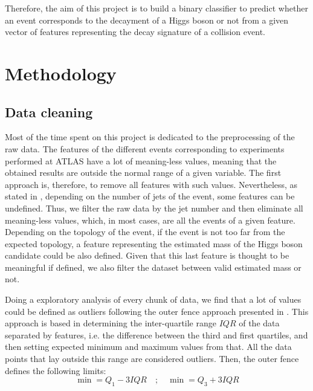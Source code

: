 \documentclass[10pt,conference,compsocconf]{IEEEtran}
\begin{document}

Therefore, the aim of this project is to build a binary classifier to predict whether an event corresponds to the decayment of a Higgs boson or not from a given vector of features representing the decay signature of a collision event.


\section{Methodology}
\label{sec:methodology}
\subsection{Data cleaning}
\label{sec:data-cleaning}
Most of the time spent on this project is dedicated to the preprocessing of the raw data. The features of the different events corresponding to experiments performed at ATLAS have a lot of meaning-less values, meaning that the obtained results are outside the normal range of a given variable. The first approach is, therefore, to remove all features with such values. Nevertheless, as stated in \cite{dataset}, depending on the number of jets of the event, some features can be undefined. Thus, we filter the raw data by the jet number and then eliminate all meaning-less values, which, in most cases, are all the events of a given feature. Depending on the topology of the event, if the event is not too far from the expected topology, a feature representing the estimated mass of the Higgs boson candidate could be also defined. Given that this last feature is thought to be meaningful if defined, we also filter the dataset between valid estimated mass or not.

Doing a exploratory analysis of every chunk of data, we find that a lot of values could be defined as outliers following the outer fence approach presented in \cite{tukey77}. This approach is based in determining the inter-quartile range $IQR$ of the data separated by features, i.e. the difference between the third and first quartiles, and then setting expected minimum and maximum values from that. All the data points that lay outside this range are considered outliers. Then, the outer fence defines the following limits:
\begin{equation}
    \min = Q_1-3IQR \quad ; \quad \min = Q_3+3IQR
\end{equation}

\end{document}
